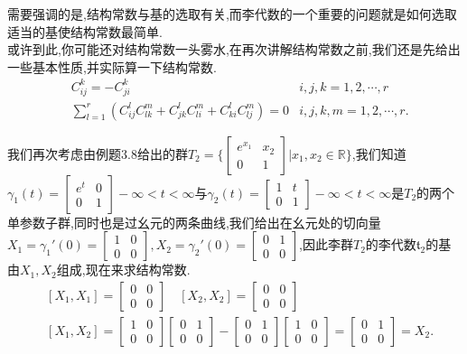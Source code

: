需要强调的是,结构常数与基的选取有关,而李代数的一个重要的问题就是如何选取适当的基使结构常数最简单.\\
或许到此,你可能还对结构常数一头雾水,在再次讲解结构常数之前,我们还是先给出一些基本性质,并实际算一下结构常数.
\begin{equation}
    \begin{aligned}
        &C_{ij}^{ k}=-C_{ji}^{ k}&i,j,k=1,2,\cdots,r\\
        &\sum_{l=1}^{r}\left(C_{ij}^{l}C_{lk}^{m}+C_{jk}^{l}C_{li}^{m}+C_{ki}^{l}C_{lj}^{m}\right)=0&i,j,k,m=1,2,\cdots,r.\end{aligned}
\end{equation}
\begin{example}
    我们再次考虑由例题3.8给出的群$T_2=\Big\{\begin{bmatrix}e^{x_1}&x_2\\0&1\end{bmatrix}\Big|x_1,x_2\in\mathbb{R}\Big\}$,我们知道$\gamma_1(t)=\begin{bmatrix}e^t&0\\0&1\end{bmatrix} -\infty<t<\infty $与$\gamma_2(t)=\begin{bmatrix}1&t\\0&1\end{bmatrix} -\infty<t<\infty $是$T_2$的两个单参数子群,同时也是过幺元的两条曲线,我们给出在幺元处的切向量$X_1=\gamma_1'(0)=\begin{bmatrix}1&0\\0&0\end{bmatrix},X_2=\gamma_2'(0)=\begin{bmatrix}0&1\\0&0\end{bmatrix}$,因此李群$T_2$的李代数$\mathfrak{t}_2$的基由$X_1,X_2$组成,现在来求结构常数.
    \begin{equation}
        \begin{aligned}&[X_1,X_1]=\begin{bmatrix}0&0\\0&0\end{bmatrix}\quad[X_2,X_2]=\begin{bmatrix}0&0\\0&0\end{bmatrix}\\&[X_1,X_2]=\begin{bmatrix}1&0\\0&0\end{bmatrix}\begin{bmatrix}0&1\\0&0\end{bmatrix}-\begin{bmatrix}0&1\\0&0\end{bmatrix}\begin{bmatrix}1&0\\0&0\end{bmatrix}=\begin{bmatrix}0&1\\0&0\end{bmatrix}=X_2.\end{aligned}

\end{equation}
\end{example}
